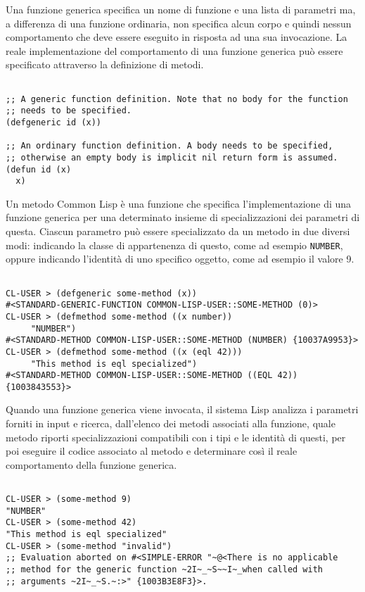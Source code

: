 Una funzione generica specifica un nome di funzione e una lista di parametri
ma, a differenza di una funzione ordinaria, non specifica alcun corpo e quindi
nessun comportamento che deve essere eseguito in risposta ad una sua
invocazione. La reale implementazione del comportamento di una funzione
generica può essere specificato attraverso la definizione di metodi.

\begin{lstlisting}[caption=Confronto tra definizione di funzioni generiche e
ordinarie]

;; A generic function definition. Note that no body for the function
;; needs to be specified.
(defgeneric id (x))

;; An ordinary function definition. A body needs to be specified,
;; otherwise an empty body is implicit nil return form is assumed.
(defun id (x)
  x)

\end{lstlisting}

Un metodo Common Lisp è una funzione che specifica l’implementazione di una
funzione generica per una determinato insieme di specializzazioni dei
parametri di questa. Ciascun parametro può essere specializzato da un metodo
in due diversi modi: indicando la classe di appartenenza di questo, come ad
esempio \texttt{NUMBER}, oppure indicando l’identità di uno specifico
oggetto, come ad esempio il valore 9.

\begin{lstlisting}[caption=Esempi definizione di metodi Common Lisp]

CL-USER > (defgeneric some-method (x))
#<STANDARD-GENERIC-FUNCTION COMMON-LISP-USER::SOME-METHOD (0)>
CL-USER > (defmethod some-method ((x number))
     "NUMBER")
#<STANDARD-METHOD COMMON-LISP-USER::SOME-METHOD (NUMBER) {10037A9953}>
CL-USER > (defmethod some-method ((x (eql 42)))
     "This method is eql specialized")
#<STANDARD-METHOD COMMON-LISP-USER::SOME-METHOD ((EQL 42)) {1003843553}>

\end{lstlisting}

Quando una funzione generica viene invocata, il sistema Lisp analizza i
parametri forniti in input e ricerca, dall’elenco dei metodi associati alla
funzione, quale metodo riporti specializzazioni compatibili con i tipi e le
identità di questi, per poi eseguire il codice associato al metodo e
determinare così il reale comportamento della funzione generica.

\begin{lstlisting}[caption=Esempi di invocazione di metodi Common Lisp]

CL-USER > (some-method 9)
"NUMBER"
CL-USER > (some-method 42)
"This method is eql specialized"
CL-USER > (some-method "invalid")
;; Evaluation aborted on #<SIMPLE-ERROR "~@<There is no applicable
;; method for the generic function ~2I~_~S~~I~_when called with
;; arguments ~2I~_~S.~:>" {1003B3E8F3}>.

\end{lstlisting}

